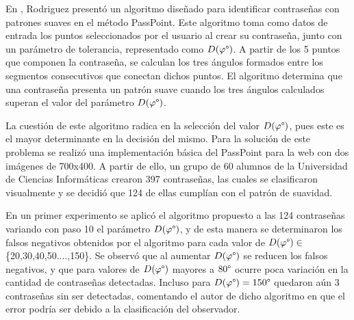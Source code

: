 \documentclass[12pt]{report}
\begin{document}
En \cite{3}, Rodriguez presentó un algoritmo diseñado para identificar contraseñas con patrones suaves en el método PassPoint. Este algoritmo toma como datos de entrada los puntos seleccionados por el usuario al crear su contraseña, junto con un parámetro de tolerancia, representado como $D(\varphi\degree)$. A partir de los 5 puntos que componen la contraseña, se calculan los tres ángulos formados entre los segmentos consecutivos que conectan dichos puntos. El algoritmo determina que una contraseña presenta un patrón suave cuando los tres ángulos calculados superan el valor del parámetro $D(\varphi\degree)$.

La cuestión de este algoritmo radica en la selección del valor $D(\varphi\degree)$, pues este es el mayor determinante en la decisión del mismo. Para la solución de este problema se realizó una implementación básica del PassPoint para la web con dos imágenes de 700x400. A partir de ello, un grupo de 60 alumnos de la Universidad de Ciencias Informáticas crearon 397 contraseñas, las cuales se clasificaron visualmente y se decidió que 124 de ellas cumplían con el patrón de suavidad. 

En un primer experimento se aplicó el algoritmo propuesto a las 124 contraseñas variando con paso 10 el parámetro $D(\varphi\degree)$, y de esta manera se determinaron los falsos negativos obtenidos por el algoritmo para cada valor de $D(\varphi\degree)\in$ \{20,30,40,50....,150\}. Se observó que al aumentar $D(\varphi\degree)$ se reducen los falsos negativos, y que para valores de $D(\varphi\degree)$ mayores a $80\degree$  ocurre poca variación en la cantidad de contraseñas detectadas. Incluso para $D(\varphi\degree)=150\degree$ quedaron aún 3 contraseñas sin ser detectadas, comentando el autor de dicho algoritmo en \cite{3} que el error podría ser debido a la clasificación del observador.  
\end{document}

